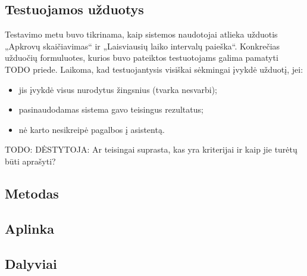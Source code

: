 


\subsection{Testuojamos užduotys}

Testavimo metu buvo tikrinama, kaip sistemos naudotojai atlieka užduotis
„Apkrovų skaičiavimas“ ir „Laisviausių laiko intervalų paieška“.
Konkrečias užduočių formuluotes, kurios buvo pateiktos testuotojams
galima pamatyti TODO priede. Laikoma, kad testuojantysis visiškai sėkmingai
įvykdė užduotį, jei:
\begin{itemize}
  \item jis įvykdė visus nurodytus žingsnius (tvarka nesvarbi);
  \item pasinaudodamas sistema gavo teisingus rezultatus;
  \item nė karto nesikreipė pagalbos į asistentą.
\end{itemize}
TODO: DĖSTYTOJA: Ar teisingai suprasta, kas yra kriterijai ir kaip jie
turėtų būti aprašyti?

\subsection{Metodas}

\subsection{Aplinka}

\subsection{Dalyviai}
